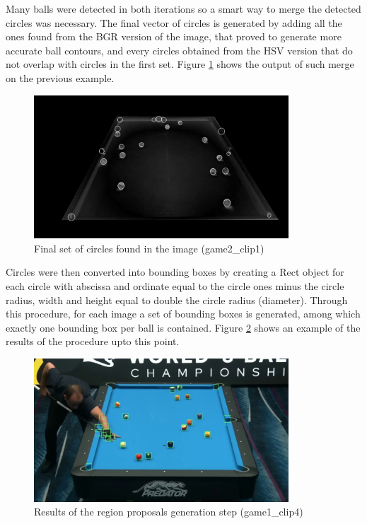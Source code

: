 Many balls were detected in both iterations so a smart way to merge the detected circles was necessary.
The final vector of circles is generated by adding all the ones found from the BGR version of the image, that proved 
to generate more accurate ball contours, and every circles obtained from the HSV version that do not overlap with circles
in the first set. Figure \ref{fig:circles_final} shows the output of such merge on the previous example.
\begin{figure}[h]
    \centering
    \includegraphics[width=0.85\textwidth]{imgs/ball_localization/circles_merged.jpg}
    \caption{Final set of circles found in the image (game2\_clip1)}
    \label{fig:circles_final}
\end{figure}

Circles were then converted into bounding boxes by creating a Rect object for each circle with abscissa and ordinate equal to the circle ones minus the circle radius,
width and height equal to double the circle radius (diameter).
Through this procedure, for each image a set of bounding boxes is generated, among which exactly one bounding box per ball is contained. 
Figure \ref{fig:fp_detection} shows an example of the results of the procedure upto this point.\\
\begin{figure}[h]
    \centering
    \includegraphics[width=0.85\textwidth]{imgs/ball_localization/fp_detection.jpg}
    \caption{Results of the region proposals generation step (game1\_clip4)}
    \label{fig:fp_detection}
\end{figure}


